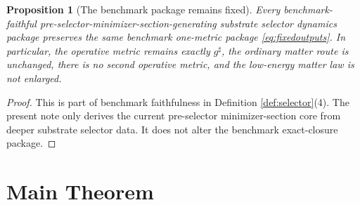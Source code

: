 \documentclass[11pt]{article}
\newcommand{\CompletedMetric}{g^{\sharp}}
\newtheorem{proposition}{Proposition}
\begin{document}
\begin{proposition}[The benchmark package remains fixed]
\label{prop:benchmark}
Every benchmark-faithful pre-selector-minimizer-section-generating substrate selector dynamics package preserves the same benchmark one-metric package \eqref{eq:fixedoutputs}. In particular, the operative metric remains exactly \(\CompletedMetric\), the ordinary matter route is unchanged, there is no second operative metric, and the low-energy matter law is not enlarged.
\end{proposition}

\begin{proof}
This is part of benchmark faithfulness in Definition \ref{def:selector}(4). The present note only derives the current pre-selector minimizer-section core from deeper substrate selector data. It does not alter the benchmark exact-closure package.
\end{proof}

\section{Main Theorem}
\end{document}
